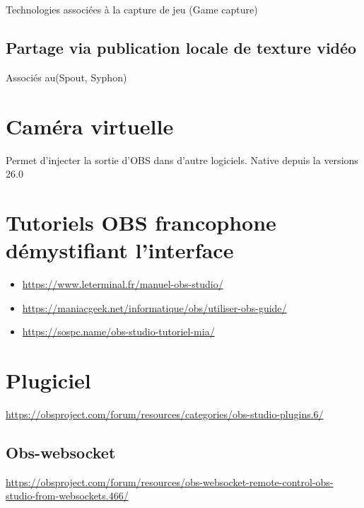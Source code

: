 \documentclass[
  french,
]{book}
\providecommand{\tightlist}{%
  \setlength{\itemsep}{0pt}\setlength{\parskip}{0pt}}
\begin{document}
Technologies associées à la capture de jeu (Game capture)

\hypertarget{partage-via-publication-locale-de-texture-viduxe9o}{%
\subsection{Partage via publication locale de texture vidéo}\label{partage-via-publication-locale-de-texture-viduxe9o}}

Associés au(Spout, Syphon)

\hypertarget{camuxe9ra-virtuelle}{%
\section{Caméra virtuelle}\label{camuxe9ra-virtuelle}}

Permet d'injecter la sortie d'OBS dans d'autre logiciels.
Native depuis la versions 26.0

\hypertarget{tutoriels-obs-francophone-duxe9mystifiant-linterface}{%
\section{Tutoriels OBS francophone démystifiant l'interface}\label{tutoriels-obs-francophone-duxe9mystifiant-linterface}}

\begin{itemize}
\tightlist
\item
  \url{https://www.leterminal.fr/manuel-obs-studio/}
\item
  \url{https://maniacgeek.net/informatique/obs/utiliser-obs-guide/}
\item
  \url{https://sospc.name/obs-studio-tutoriel-mia/}
\end{itemize}

\hypertarget{plugiciel}{%
\section{Plugiciel}\label{plugiciel}}

\url{https://obsproject.com/forum/resources/categories/obs-studio-plugins.6/}

\hypertarget{obs-websocket}{%
\subsection{Obs-websocket}\label{obs-websocket}}

\url{https://obsproject.com/forum/resources/obs-websocket-remote-control-obs-studio-from-websockets.466/}
\end{document}
